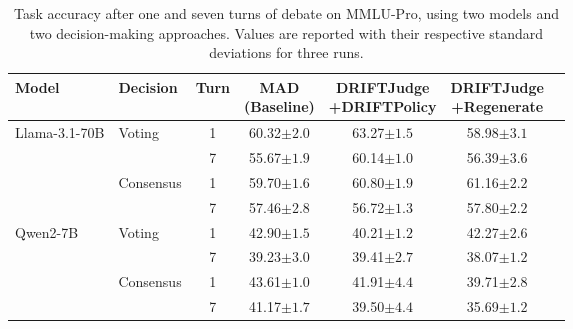 \begin{table}[h]
\centering
\small
\begin{tabular}{llc|cccc}
\toprule
\textbf{Model} & \textbf{Decision} & \textbf{Turn} & \makecell{\textbf{MAD}\\\textbf{(Baseline)}} & \makecell{\textbf{DRIFTJudge}\\\textbf{+DRIFTPolicy}} & \makecell{\textbf{DRIFTJudge}\\\textbf{+Regenerate}} \\
\midrule

\multirow{4}{*}{Llama-3.1-70B} 
    & \multirow{2}{*}{Voting} 
        & 1 & 60.32\tiny{$\pm 2.0$} & 63.27\tiny{$\pm 1.5$} & 58.98\tiny{$\pm 3.1$} \\
    &   & 7 & 55.67\tiny{$\pm 1.9$} & 60.14\tiny{$\pm 1.0$} & 56.39\tiny{$\pm 3.6$} \\
    & \multirow{2}{*}{Consensus} 
        & 1 & 59.70\tiny{$\pm 1.6$} & 60.80\tiny{$\pm 1.9$} & 61.16\tiny{$\pm 2.2$} \\
    &   & 7 & 57.46\tiny{$\pm 2.8$} & 56.72\tiny{$\pm 1.3$} & 57.80\tiny{$\pm 2.2$} \\

\midrule

\multirow{4}{*}{Qwen2-7B} 
    & \multirow{2}{*}{Voting} 
        & 1 & 42.90\tiny{$\pm 1.5$} & 40.21\tiny{$\pm 1.2$} & 42.27\tiny{$\pm 2.6$} \\
    &   & 7 & 39.23\tiny{$\pm 3.0$} & 39.41\tiny{$\pm 2.7$} & 38.07\tiny{$\pm 1.2$} \\
    & \multirow{2}{*}{Consensus} 
        & 1 & 43.61\tiny{$\pm 1.0$} & 41.91\tiny{$\pm 4.4$} & 39.71\tiny{$\pm 2.8$} \\
    &   & 7 & 41.17\tiny{$\pm 1.7$} & 39.50\tiny{$\pm 4.4$} & 35.69\tiny{$\pm 1.2$} \\

\bottomrule
\end{tabular}
\caption{Task accuracy after one and seven turns of debate on MMLU-Pro, using two models and two decision-making approaches. Values are reported with their respective standard deviations for three runs.}
\label{tab:task_performance_absolute}
\end{table}
